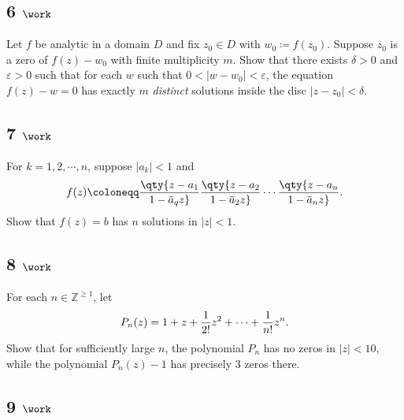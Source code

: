 \hypertarget{work-65}{%
\subsection{\texorpdfstring{6
\(\work\)}{6 \textbackslash work}}\label{work-65}}

Let \(f\) be analytic in a domain \(D\) and fix \(z_0 \in D\) with
\(w_0 \coloneqq f(z_0)\). Suppose \(z_0\) is a zero of \(f(z) - w_0\)
with finite multiplicity \(m\). Show that there exists \(\delta >0\) and
\(\varepsilon> 0\) such that for each \(w\) such that
\(0 < {\left\lvert {w-w_0} \right\rvert} < \varepsilon\), the equation
\(f(z) - w = 0\) has exactly \(m\) \emph{distinct} solutions inside the
disc \({\left\lvert {z-z_0} \right\rvert} < \delta\).

\hypertarget{work-66}{%
\subsection{\texorpdfstring{7
\(\work\)}{7 \textbackslash work}}\label{work-66}}

For \(k=1,2,\cdots, n\), suppose
\({\left\lvert {a_k} \right\rvert} < 1\) and
\begin{align*}
f(z) \coloneqq\qty{z - a_1 \over 1 - \mkern 1.5mu\overline{\mkern-1.5mua\mkern-1.5mu}\mkern 1.5mu_q z} \qty{z-a_2 \over 1 - \mkern 1.5mu\overline{\mkern-1.5mua\mkern-1.5mu}\mkern 1.5mu_2 z} \cdots \qty{z - a_n \over 1 - \mkern 1.5mu\overline{\mkern-1.5mua\mkern-1.5mu}\mkern 1.5mu_n z}
.\end{align*}
Show that \(f(z) = b\) has \(n\) solutions in
\({\left\lvert {z} \right\rvert} < 1\).

\hypertarget{work-67}{%
\subsection{\texorpdfstring{8
\(\work\)}{8 \textbackslash work}}\label{work-67}}

For each \(n\in {\mathbb{Z}}^{\geq 1}\), let
\begin{align*}
P_n(z) = 1 + z + {1\over 2!} z^2 + \cdots + {1\over n!}z^n
.\end{align*}
Show that for sufficiently large \(n\), the polynomial \(P_n\) has no
zeros in \({\left\lvert {z} \right\rvert} < 10\), while the polynomial
\(P_n(z) - 1\) has precisely 3 zeros there.

\hypertarget{work-68}{%
\subsection{\texorpdfstring{9
\(\work\)}{9 \textbackslash work}}\label{work-68}}

